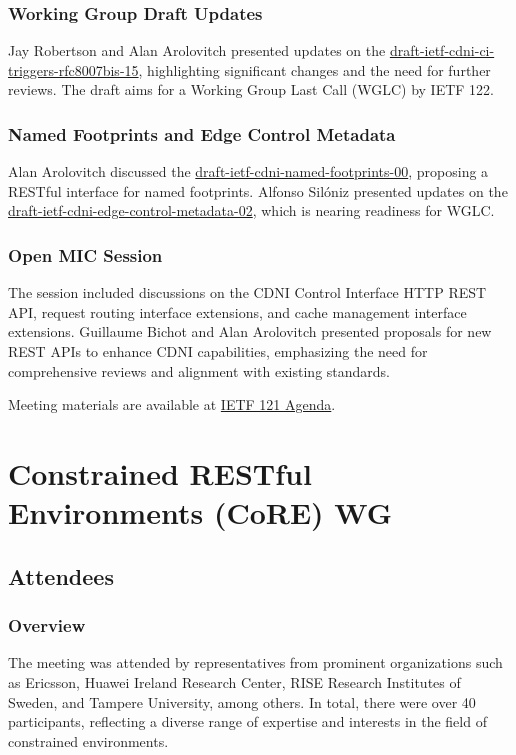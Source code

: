 \documentclass{article}
\begin{document}
\subsubsection{Working Group Draft Updates}
Jay Robertson and Alan Arolovitch presented updates on the \href{https://datatracker.ietf.org/doc/html/draft-ietf-cdni-ci-triggers-rfc8007bis-15}{draft-ietf-cdni-ci-triggers-rfc8007bis-15}, highlighting significant changes and the need for further reviews. The draft aims for a Working Group Last Call (WGLC) by IETF 122.

\subsubsection{Named Footprints and Edge Control Metadata}
Alan Arolovitch discussed the \href{https://datatracker.ietf.org/doc/html/draft-ietf-cdni-named-footprints-00}{draft-ietf-cdni-named-footprints-00}, proposing a RESTful interface for named footprints. Alfonso Silóniz presented updates on the \href{https://datatracker.ietf.org/doc/html/draft-ietf-cdni-edge-control-metadata-02}{draft-ietf-cdni-edge-control-metadata-02}, which is nearing readiness for WGLC.

\subsubsection{Open MIC Session}
The session included discussions on the CDNI Control Interface HTTP REST API, request routing interface extensions, and cache management interface extensions. Guillaume Bichot and Alan Arolovitch presented proposals for new REST APIs to enhance CDNI capabilities, emphasizing the need for comprehensive reviews and alignment with existing standards.

Meeting materials are available at \href{https://datatracker.ietf.org/meeting/121/agenda}{IETF 121 Agenda}.






\newpage

\section{Constrained RESTful Environments (CoRE) WG}

\subsection{Attendees}

\subsubsection{Overview}
The meeting was attended by representatives from prominent organizations such as Ericsson, Huawei Ireland Research Center, RISE Research Institutes of Sweden, and Tampere University, among others. In total, there were over 40 participants, reflecting a diverse range of expertise and interests in the field of constrained environments.
\end{document}
